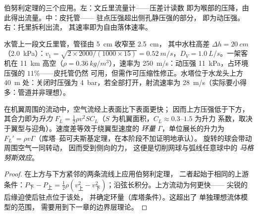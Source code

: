\begin{omfigure}
{\small 伯努利定理的三个应用。左：文丘里流量计——压差计读数
即为喉部的压降，由此得出流量。中：皮托管——
驻点压强超出侧孔静压强的部分，
即为动压强。右：托里拆利出流，
其速率即为自由落体速率。}
\end{omfigure}

\begin{example}[数值]\label{ex:b2:euler-bernoulli:numbers}
水管上一段文丘里管，管径由 \qty{5}{cm} 收窄至 \qty{2.5}{cm}，
其中水柱高差 $\Delta h = \qty{20}{cm}$（\qty{2.0}{kPa}）：$v_1 = \sqrt{2 \times 2000/
(1000 \times 15)} = \qty{0.52}{m/s}$，$D_V = \qty{1.0}{L/s}$。一架客机在
\qty{11}{km} 高空（$\rho = \qty{0.36}{kg/m^3}$），速率为 \qty{250}{m/s}：动压强
\qty{11}{kPa}，占环境压强的 $11\%$——皮托管仍然
可用，但需作可压缩性修正。水塔位于水龙头上方 \qty{40}{m}
处：关闭时压强为 \qty{4}{bar}，若全部打开，射流速率为
\qty{28}{m/s}（实际要小得多：管道并非理想）。
\end{example}

\begin{proposition}[机翼升力]\label{prop:b2:euler-bernoulli:lift}
在机翼周围的流动中，空气流经上表面比下表面更快；
因而上方压强低于下方，其合力即为\emph{升力} $F_L =
\tfrac12\rho v^2SC_L$（$S$ 为机翼面积，$C_L \approx 0.3$--$1.5$ 为升力
系数，取决于翼型与迎角）。速度差等效于绕翼型速度的
\emph{环量} $\Gamma$，单位展长的升力为 $F_L' =
\rho v\Gamma$（库塔–茹可夫斯基定理，在本阶段不加证明地承认）。
旋转的球会带动周围空气一同转动，
因而受到侧向的力，
这便是切削网球与弧线任意球中的
\emph{马格努斯效应}。
\end{proposition}

\begin{proof}
在上方与下方紧邻的两条流线上应用伯努利定理，
二者起始于相同的上游条件：$P_{\text{下}} - P_{\text{上}} = \tfrac12\rho
(v_{\text{上}}^2 - v_{\text{下}}^2)$；沿弦长积分。上方流动为何更快——
尖锐的后缘迫使后驻点位于该处，
并确定环量（库塔条件）。这超出了
单独理想流体模型的范围，
需要用到下一章的边界层理论。
\end{proof}

